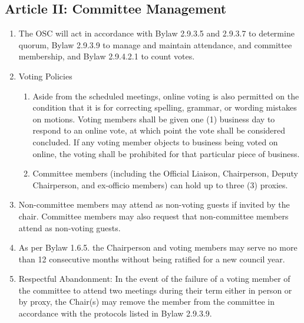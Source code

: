 \subsection{Article II: Committee Management}
	\begin{enumerate}[label*=\arabic*., align=left]	
	\item The OSC will act in accordance with Bylaw 2.9.3.5 and 2.9.3.7 to determine quorum, Bylaw 2.9.3.9 to manage and maintain attendance, and committee membership, and Bylaw 2.9.4.2.1 to count votes.
	\item Voting Policies
		\begin{enumerate}[label*=\arabic*., align=left]	
		\item Aside from the scheduled meetings, online voting is also permitted on the condition that it is for correcting spelling, grammar, or wording mistakes on motions. Voting members shall be given one (1) business day to respond to an online vote, at which point the vote shall be considered concluded. If any voting member objects to business being voted on online, the voting shall be prohibited for that particular piece of business.
		\item Committee members (including the Official Liaison, Chairperson, Deputy Chairperson, and ex-officio members) can hold up to three (3) proxies.
		\end{enumerate}
	\item Non-committee members may attend as non-voting guests if invited by the chair. Committee members may also request that non-committee members attend as non-voting guests.	
	\item As per Bylaw 1.6.5. the Chairperson and voting members may serve no more than 12 consecutive months without being ratified for a new council year.
	\item Respectful Abandonment: In the event of the failure of a voting member of the committee to attend two meetings during their term either in person or by proxy, the Chair(s) may remove the member from the committee in accordance with the protocols listed in Bylaw 2.9.3.9.
	\end{enumerate}

